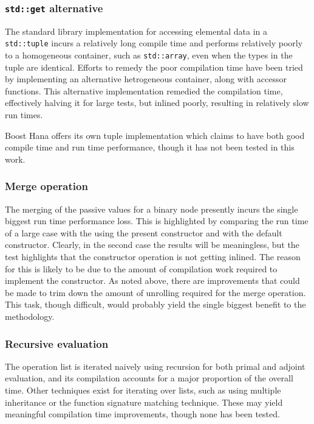 \documentclass[a4paper,10pt]{article}
\begin{document}
\subsubsection{\texttt{std::get} alternative}
The standard library implementation for accessing elemental data in a \texttt{std::tuple} incurs a relatively long compile time and performs relatively poorly to a homogeneous container, such as \texttt{std::array}, even when the types in the tuple are identical. Efforts to remedy the poor compilation time have been tried by implementing an alternative hetrogeneous container, along with accessor functions. This alternative implementation remedied the compilation time, effectively halving it for large tests, but inlined poorly, resulting in relatively slow run times.

Boost Hana offers its own tuple implementation which claims to have both good compile time and run time performance, though it has not been tested in this work.

\subsubsection{Merge operation}
The merging of the passive values for a binary node presently incurs the single biggest run time performance loss. This is highlighted by comparing the run time of a large case with the using the present constructor and with the default constructor. Clearly, in the second case the results will be meaningless, but the test highlights that the constructor operation is not getting inlined. The reason for this is likely to be due to the amount of compilation work required to implement the constructor. As noted above, there are improvements that could be made to trim down the amount of unrolling required for the merge operation. This task, though difficult, would probably yield the single biggest benefit to the methodology.


\subsubsection{Recursive evaluation}
The operation list is iterated naively using recursion for both primal and adjoint evaluation, and its compilation accounts for a major proportion of the overall time. Other techniques exist for iterating over lists, such as using multiple inheritance or the function signature matching technique. These may yield meaningful compilation time improvements, though none has been tested.
\end{document}
